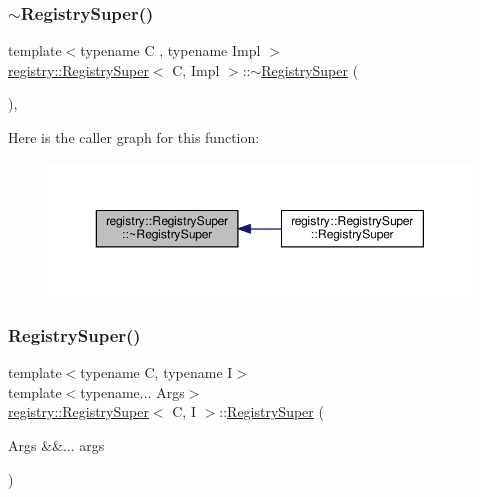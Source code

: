 \mbox{\label{classregistry_1_1RegistrySuper_a80a46da9b76998a81383a0b288c897eb}} 
\subsubsection{\texorpdfstring{$\sim$\+Registry\+Super()}{~RegistrySuper()}}
{\footnotesize\ttfamily template$<$typename C , typename Impl $>$ \\
\hyperlink{classregistry_1_1RegistrySuper}{registry\+::\+Registry\+Super}$<$ C, Impl $>$\+::$\sim$\hyperlink{classregistry_1_1RegistrySuper}{Registry\+Super} (\begin{DoxyParamCaption}{ }\end{DoxyParamCaption})\hspace{0.3cm}{\ttfamily [default]}, {\ttfamily [noexcept]}}

Here is the caller graph for this function\+:
\nopagebreak
\begin{figure}[H]
\begin{center}
\leavevmode
\includegraphics[width=350pt]{classregistry_1_1RegistrySuper_a80a46da9b76998a81383a0b288c897eb_icgraph}
\end{center}
\end{figure}
\mbox{\label{classregistry_1_1RegistrySuper_a91a93b354ebf303d24b0821a252c1ccf}} 
\subsubsection{\texorpdfstring{Registry\+Super()}{RegistrySuper()}\hspace{0.1cm}{\footnotesize\ttfamily [5/5]}}
{\footnotesize\ttfamily template$<$typename C, typename I$>$ \\
template$<$typename... Args$>$ \\
\hyperlink{classregistry_1_1RegistrySuper}{registry\+::\+Registry\+Super}$<$ C, I $>$\+::\hyperlink{classregistry_1_1RegistrySuper}{Registry\+Super} (\begin{DoxyParamCaption}\item[{Args \&\&...}]{args }\end{DoxyParamCaption})\hspace{0.3cm}{\ttfamily [noexcept]}}

